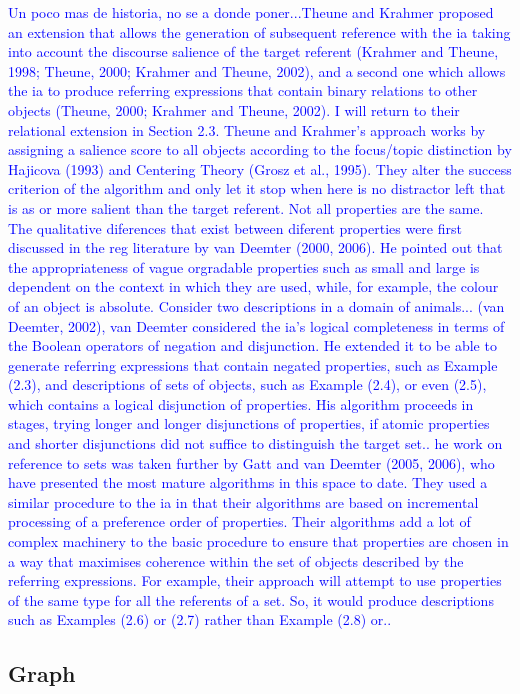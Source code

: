 \textcolor{blue}{Un poco mas de historia, no se a donde poner...Theune and Krahmer proposed an extension that allows the generation of subsequent reference with the ia taking into account the discourse salience of the target referent (Krahmer and Theune, 1998; Theune, 2000; Krahmer and Theune, 2002), and a second one which allows the ia to produce referring expressions that
contain binary relations to other objects (Theune, 2000; Krahmer and Theune, 2002). I will return to their relational extension in Section 2.3. Theune and Krahmer's approach works by assigning a salience score to all objects according to the
focus/topic distinction by Hajicova (1993) and Centering Theory (Grosz et al., 1995). They alter the success criterion of the algorithm and only let it stop when here is no distractor left that is as or more salient than the target referent.
Not all properties are the same. The qualitative diferences that exist between diferent properties were first discussed in the
reg literature by van Deemter (2000, 2006). He pointed out that the appropriateness of
vague orgradable properties such as small and large is dependent on the context in which they are used, while,
for example, the colour of an object is absolute. Consider two descriptions in a domain of animals... (van Deemter, 2002), van Deemter considered the ia's logical completeness in terms of the Boolean operators of negation and disjunction. He extended it to
be able to generate referring expressions that contain negated properties, such as Example (2.3), and descriptions of sets of objects, such as Example (2.4), or even (2.5), which contains a logical disjunction of properties. His algorithm proceeds
in stages, trying longer and longer disjunctions of properties, if atomic properties
and shorter disjunctions did not suffice to distinguish the target set.. he work on reference to sets was taken further by Gatt and van Deemter (2005, 2006), who have presented the most mature algorithms in this space to
date. They used a similar procedure to the ia in that their algorithms are based
on incremental processing of a preference order of properties. Their algorithms
add a lot of complex machinery to the basic procedure to ensure that properties
are chosen in a way that maximises coherence within the set of objects described
by the referring expressions. For example, their approach will attempt to use
properties of the same type for all the referents of a set. So, it would produce
descriptions such as Examples (2.6) or (2.7) rather than Example (2.8) or.. }

\subsection{Graph}

